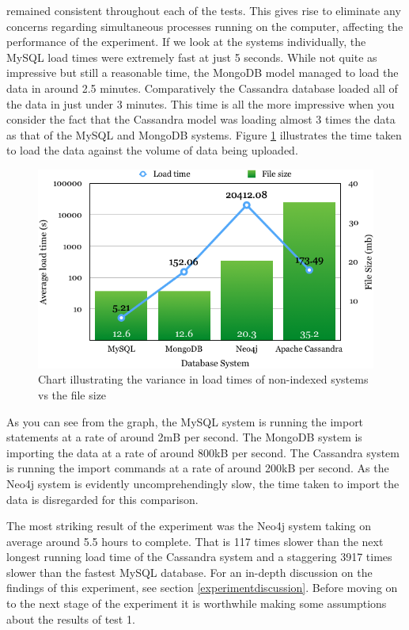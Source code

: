\parindent 0pt
remained consistent throughout each of the tests. This gives rise to eliminate any concerns regarding simultaneous processes running on the computer, affecting the performance of the experiment.
\parindent 15pt
If we look at the systems individually, the MySQL load times were extremely fast at just 5 seconds. While not quite as impressive but still a reasonable time, the MongoDB model managed to load the data in around 2.5 minutes. Comparatively the Cassandra database loaded all of the data in just under 3 minutes. This time is all the more impressive when you consider the fact that the Cassandra model was loading almost 3 times the data as that of the MySQL and MongoDB systems. Figure \ref{fig:loadvsfile} illustrates the time taken to load the data against the volume of data being uploaded.
\begin{figure}[H]\begin{center}\includegraphics[width=1\linewidth]{images/loadvsfile}\caption{Chart illustrating the variance in load times of non-indexed systems vs the file size}\label{fig:loadvsfile}\end{center}\end{figure}

As you can see from the graph, the MySQL system is running the import statements at a rate of around 2mB per second. The MongoDB system is importing the data at a rate of around 800kB per second. The Cassandra system is running the import commands at a rate of around 200kB per second. As the Neo4j system is evidently uncomprehendingly slow, the time taken to import the data is disregarded for this comparison.

The most striking result of the experiment was the Neo4j system taking on average around 5.5 hours to complete. That is 117 times slower than the next longest running load time of the Cassandra system and a staggering 3917 times slower than the fastest MySQL database. For an in-depth discussion on the findings of this experiment, see section \ref{experimentdiscussion}. Before moving on to the next stage of the experiment it is worthwhile making some assumptions about the results of test 1.

